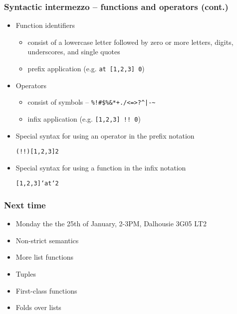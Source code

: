 \documentclass[final,handout]{beamer}
\begin{document}
\begin{frame}[fragile]
    \frametitle{Syntactic intermezzo -- functions and operators (cont.)}

    \begin{itemize}
        \item<1-> Function identifiers
            \begin{itemize}
                \item consist of a lowercase letter followed by zero or more
                    letters, digits, underscores, and single quotes
                \item prefix application (e.g. {\color{blue} \texttt{at [1,2,3]
                    0}})
            \end{itemize}
        \item<2-> Operators
            \begin{itemize}
                \item consist of symbols -- 
                    \texttt{\%!\#\$\%\&*+./<=>?\@\^{}|-\~{}}
                        
                    \item infix application (e.g. {\color{blue} \texttt{[1,2,3]
                        !! 0}})
            \end{itemize}
        \item<3-> Special syntax for using an operator in the prefix notation
            \begin{alltt}
        (!!) [1,2,3] 2
            \end{alltt}

        \item<4-> Special syntax for using a function in the infix notation
            \begin{alltt}
        [1,2,3] `at` 2
            \end{alltt}

    \end{itemize}

\end{frame}

\begin{frame}
    \frametitle{Next time}

    \begin{itemize}
        \item Monday the the 25th of January, 2-3PM,
            Dalhousie 3G05 LT2

        \item Non-strict semantics
        \item More list functions
        \item Tuples
        \item First-class functions
        \item Folds over lists
    \end{itemize}

\end{frame}
\end{document}

